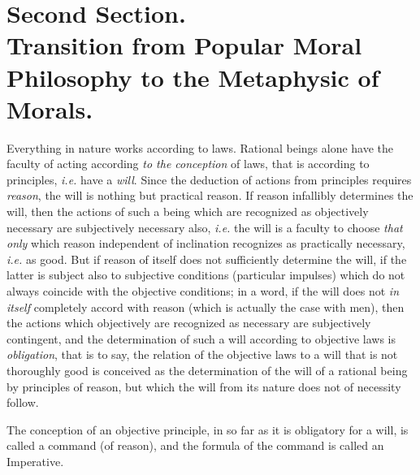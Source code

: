 \section*{Second Section.\\\smaller Transition from Popular Moral
Philosophy to the Metaphysic of Morals.}


Everything in nature works according to laws. Rational beings
alone have the faculty of acting according \textit{to the conception}
of laws, that is according to principles, \textit{i.e.} have a
\textit{will}. Since the deduction of actions from principles requires
\textit{reason}, the will is nothing but practical reason. If reason
infallibly determines the will, then the actions of such a being which
are recognized as objectively necessary are subjectively necessary
also, \textit{i.e.} the will is a faculty to choose \textit{that only}
which reason independent of inclination recognizes as practically
necessary, \textit{i.e.} as good. But if reason of itself does not
sufficiently determine the will, if the latter is subject also to
subjective conditions (particular impulses) which do not always
coincide with the objective conditions; in a word, if the will does
not \textit{in itself} completely accord with reason (which is
actually the case with men), then the actions which objectively are
recognized as necessary are subjectively contingent, and the
determination of  such a will according to objective laws is
\textit{obligation}, that is to say, the relation of the objective
laws to a will that is not thoroughly good is conceived as the
determination of the will of a rational being by principles of reason,
but which the will from its nature does not of necessity follow.

The conception of an objective principle, in so far as it is
obligatory for a will, is called a command (of reason), and the
formula of the command is called an Imperative.

